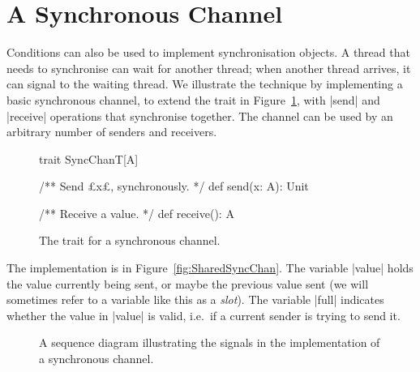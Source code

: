 \section{A Synchronous Channel}
\label{sec:conditionsChan}

Conditions can also be used to implement synchronisation objects.  A thread
that needs to synchronise can wait for another thread; when another thread
arrives, it can signal to the waiting thread.  We illustrate the technique by
implementing a basic synchronous channel, to extend the trait in
Figure~\ref{fig:SyncChanT}, with |send| and |receive| operations
that synchronise together.  The channel can be used by an arbitrary number of
senders and receivers.


\begin{figure}[htbp]
\begin{scala}
trait SyncChanT[A]{
  /** Send £x£, synchronously. */
  def send(x: A): Unit

  /** Receive a value. */
  def receive(): A
}
\end{scala}
\caption{The trait for a synchronous channel.}
\label{fig:SyncChanT}
\end{figure}


The implementation is in Figure~\ref{fig:SharedSyncChan}.  The variable
|value| holds the value currently being sent, or maybe the previous value sent
(we will sometimes refer to a variable like this as a \emph{slot}).  The
variable |full| indicates whether the value in |value| is valid, i.e.~if a
current sender is trying to send it.


\begin{figure}
\begin{center}
\def\height{5.7}
\end{center}
\caption{A sequence diagram illustrating the signals in the implementation of
  a synchronous channel.}
\label{fig:syncChan-seqDiagram}
\end{figure}

